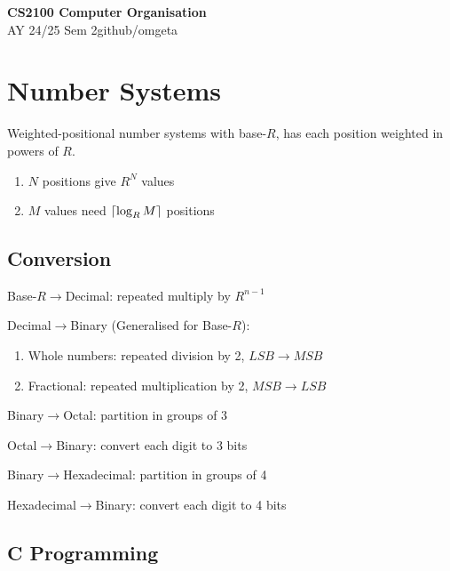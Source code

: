 \documentclass[12pt, a4paper]{article}
\newcommand{\mytitle}{CS2100 Computer Organisation}
\newcommand{\myauthor}{github/omgeta}
\newcommand{\mydate}{AY 24/25 Sem 2}
\begin{document}
\raggedright
\footnotesize
\begin{multicols*}{3}
\setlength{\premulticols}{1pt}
\setlength{\postmulticols}{1pt}
\setlength{\multicolsep}{1pt}
\setlength{\columnsep}{2pt}

{\normalsize{\textbf{\mytitle}}} \\
{\footnotesize{\mydate\hspace{2pt}\textemdash\hspace{2pt}\myauthor}}

\section{Number Systems}

Weighted-positional number systems with base-$R$, has each position weighted in powers of $R$.
\begin{enumerate}[\roman*.]
  \item $N$ positions give $R^N$ values
  \item $M$ values need $\left\lceil \log_RM \right\rceil$ positions
\end{enumerate}

\subsection{Conversion}

Base-$R$$\rightarrow$Decimal: repeated multiply by $R^{n-1}$

Decimal$\rightarrow$Binary (Generalised for Base-$R$):
\begin{enumerate}[\roman*.]
  \item Whole numbers: repeated division by 2, $LSB \rightarrow MSB$
  \item Fractional: repeated multiplication by 2, $MSB \rightarrow LSB$
\end{enumerate}

Binary$\rightarrow$Octal: partition in groups of 3

Octal$\rightarrow$Binary: convert each digit to 3 bits

Binary$\rightarrow$Hexadecimal: partition in groups of 4

Hexadecimal$\rightarrow$Binary: convert each digit to 4 bits

\subsection{C Programming}


\end{multicols*}
\end{document}

